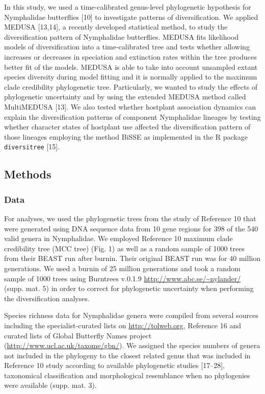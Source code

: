 \documentclass[10pt]{article}
\begin{document}
In this study, we used a time-calibrated genus-level phylogenetic
hypothesis for Nymphalidae butterflies {[}10{]} to investigate patterns
of diversification. We applied MEDUSA {[}13,14{]}, a recently developed
statistical method, to study the diversification pattern of Nymphalidae
butterflies. MEDUSA fits likelihood models of diversification into a
time-calibrated tree and tests whether allowing increases or decreases
in speciation and extinction rates within the tree produces better fit
of the models. MEDUSA is able to take into account unsampled extant
species diversity during model fitting and it is normally applied to the
maximum clade credibility phylogenetic tree. Particularly, we wanted to
study the effects of phylogenetic uncertainty and by using the extended
MEDUSA method called MultiMEDUSA {[}13{]}. We also tested whether
hostplant association dynamics can explain the diversification patterns
of component Nymphalidae lineages by testing whether character states of
hostplant use affected the diversification pattern of those lineages
employing the method BiSSE as implemented in the R package
\texttt{diversitree} {[}15{]}.

\subsection{Methods}\label{methods}

\subsubsection{Data}\label{data}

For analyses, we used the phylogenetic trees from the study of Reference
10 that were generated using DNA sequence data from 10 gene regions for
398 of the 540 valid genera in Nymphalidae. We employed Reference 10
maximum clade credibility tree (MCC tree) (Fig. 1) as well as a random
sample of 1000 trees from their BEAST run after burnin. Their original
BEAST run was for 40 million generations. We used a burnin of 25 million
generations and took a random sample of 1000 trees using Burntrees
v.0.1.9 \url{http://www.abc.se/~nylander/} (supp. mat. 5) in order to
correct for phylogenetic uncertainty when performing the diversification
analyses.

Species richness data for Nymphalidae genera were compiled from several
sources including the specialist-curated lists on
\url{http://tolweb.org}, Reference 16 and curated lists of Global
Butterfly Names project (\url{http://www.ucl.ac.uk/taxome/gbn/}). We
assigned the species numbers of genera not included in the phylogeny to
the closest related genus that was included in Reference 10 study
according to available phylogenetic studies {[}17--28{]}, taxonomical
classification and morphological resemblance when no phylogenies were
available (supp. mat. 3).
\end{document}
